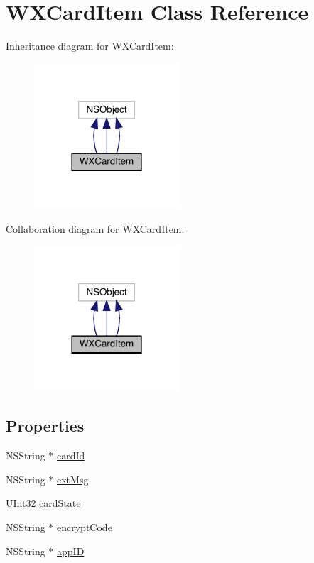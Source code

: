 \hypertarget{interface_w_x_card_item}{}\section{W\+X\+Card\+Item Class Reference}
\label{interface_w_x_card_item}


Inheritance diagram for W\+X\+Card\+Item\+:\nopagebreak
\begin{figure}[H]
\begin{center}
\leavevmode
\includegraphics[width=153pt]{interface_w_x_card_item__inherit__graph}
\end{center}
\end{figure}


Collaboration diagram for W\+X\+Card\+Item\+:\nopagebreak
\begin{figure}[H]
\begin{center}
\leavevmode
\includegraphics[width=153pt]{interface_w_x_card_item__coll__graph}
\end{center}
\end{figure}
\subsection*{Properties}
\begin{DoxyCompactItemize}
\item 
N\+S\+String $\ast$ \mbox{\hyperlink{interface_w_x_card_item_af414b6fb55bc3a64f412d48ca9482712}{card\+Id}}
\item 
N\+S\+String $\ast$ \mbox{\hyperlink{interface_w_x_card_item_afc1c448b8e56aba3534151a587935036}{ext\+Msg}}
\item 
U\+Int32 \mbox{\hyperlink{interface_w_x_card_item_a42b30677d8ca3f8d01b187371a21badf}{card\+State}}
\item 
N\+S\+String $\ast$ \mbox{\hyperlink{interface_w_x_card_item_a50a4e19e9225ca45b8618c73155b4b63}{encrypt\+Code}}
\item 
N\+S\+String $\ast$ \mbox{\hyperlink{interface_w_x_card_item_a57f847df7c17c0cbcfb0ecdf1eee19b0}{app\+ID}}
\end{DoxyCompactItemize}


